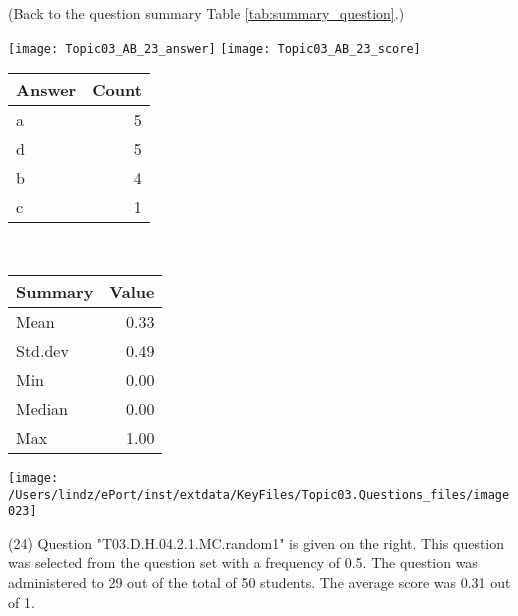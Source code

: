 \documentclass[12pt,english,nohyper]{tufte-handout}\usepackage[]{graphicx}\usepackage[]{color}
\begin{document}
 (Back to the question summary Table \ref{tab:summary_question}.)

\begin{center} \texttt{[image: Topic03\_AB\_23\_answer]} \texttt{[image: Topic03\_AB\_23\_score]} \end{center} 

\begin{center}%
\begin{tabular}{lr}
  \hline
Answer & Count \\ 
  \hline
a &   5 \\ 
  d &   5 \\ 
  b &   4 \\ 
  c &   1 \\ 
   \hline
\end{tabular}
~~~~~~~~%
\begin{tabular}{lr}
  \hline
Summary & Value \\ 
  \hline
Mean & 0.33 \\ 
  Std.dev & 0.49 \\ 
  Min & 0.00 \\ 
  Median & 0.00 \\ 
  Max & 1.00 \\ 
   \hline
\end{tabular}
\end{center}\newpage{}



\vspace{4cm}\begin{marginfigure}\texttt{[image: /Users/lindz/ePort/inst/extdata/KeyFiles/Topic03.Questions\_files/image023]}\end{marginfigure}\vspace{-4cm} (24) Question "T03.D.H.04.2.1.MC.random1" is given on the right. This question was selected from the question set with a frequency of 0.5. The question was administered to 29 out of the total of 50 students. The average score was 0.31 out of 1.
\end{document}
